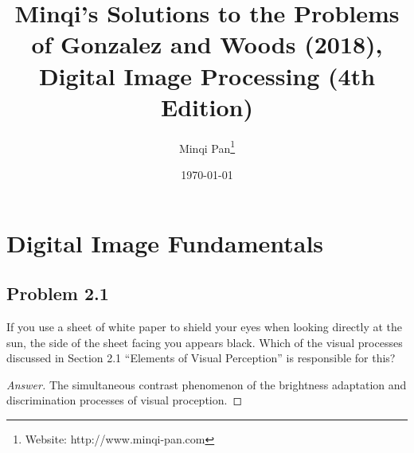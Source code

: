\documentclass{amsbook}
\theoremstyle{definition}
\theoremstyle{remark}
\numberwithin{section}{chapter}
\numberwithin{equation}{chapter}
\begin{document}
\setcounter{chapter}{1}

\frontmatter

\title{Minqi's Solutions to the Problems of Gonzalez and Woods (2018), Digital Image Processing (4th Edition)}

\author{Minqi Pan\footnote{Website: http://www.minqi-pan.com}}

\date{\today}

\maketitle

\setcounter{page}{4}

\tableofcontents

\mainmatter

\chapter{Digital Image Fundamentals}
\section{Problem 2.1}
If you use a sheet of white paper to shield your eyes
when looking directly at the sun, the side of
the sheet facing you appears black. Which of the visual
processes discussed in Section 2.1 ``Elements of Visual Perception'' is responsible for this?
\begin{proof}[Answer]
The simultaneous contrast phenomenon of the brightness adaptation and discrimination processes of visual proception.
\end{proof}
\end{document}
